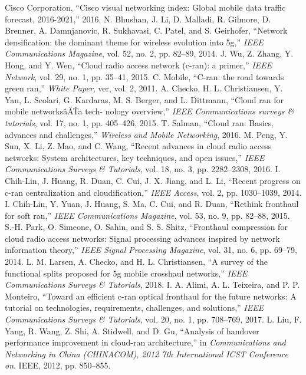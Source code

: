 \begin{multicols}{2}
\begin{thebibliography}{99}
 Cisco Corporation, “Cisco visual networking index: Global mobile data traffic forecast, 2016-2021,” 2016.
 N. Bhushan, J. Li, D. Malladi, R. Gilmore, D. Brenner, A. Damnjanovic, R. Sukhavasi, C. Patel, and S. Geirhofer, “Network densification: the dominant theme for wireless evolution into 5g,” \textit{IEEE Communications Magazine}, vol. 52, no. 2, pp. 82–89, 2014.
 J. Wu, Z. Zhang, Y. Hong, and Y. Wen, “Cloud radio access network (c-ran): a primer,” \textit{IEEE Network}, vol. 29, no. 1, pp. 35–41, 2015.
 C. Mobile, “C-ran: the road towards green ran,” \textit{White Paper}, ver, vol. 2, 2011.
 A. Checko, H. L. Christiansen, Y. Yan, L. Scolari, G. Kardaras, M. S. Berger, and L. Dittmann, “Cloud ran for mobile networksâĂŤa tech- nology overview,” \textit{IEEE Communications surveys \& tutorials}, vol. 17, no. 1, pp. 405–426, 2015.
 T. Salman, “Cloud ran: Basics, advances and challenges,” \textit{Wireless and Mobile Networking}, 2016.
 M. Peng, Y. Sun, X. Li, Z. Mao, and C. Wang, “Recent advances in cloud radio access networks: System architectures, key techniques, and open issues,” \textit{IEEE Communications Surveys \& Tutorials}, vol. 18, no. 3, pp. 2282–2308, 2016.
 I. Chih-Lin, J. Huang, R. Duan, C. Cui, J. X. Jiang, and L. Li, “Recent progress on c-ran centralization and cloudification,” \textit{IEEE Access}, vol. 2, pp. 1030–1039, 2014.
 I. Chih-Lin, Y. Yuan, J. Huang, S. Ma, C. Cui, and R. Duan, “Rethink fronthaul for soft ran,” \textit{IEEE Communications Magazine}, vol. 53, no. 9, pp. 82–88, 2015.
 S.-H. Park, O. Simeone, O. Sahin, and S. S. Shitz, “Fronthaul compression for cloud radio access networks: Signal processing advances inspired by network information theory,” \textit{IEEE Signal Processing Magazine}, vol. 31, no. 6, pp. 69–79, 2014.
 L. M. Larsen, A. Checko, and H. L. Christiansen, “A survey of the functional splits proposed for 5g mobile crosshaul networks,” \textit{IEEE Communications Surveys \& Tutorials}, 2018.
 I. A. Alimi, A. L. Teixeira, and P. P. Monteiro, “Toward an efficient c-ran optical fronthaul for the future networks: A tutorial on technologies, requirements, challenges, and solutions,” \textit{IEEE Communications Surveys \& Tutorials}, vol. 20, no. 1, pp. 708–769, 2017.
 L. Liu, F. Yang, R. Wang, Z. Shi, A. Stidwell, and D. Gu, “Analysis of handover performance improvement in cloud-ran architecture,” in \textit{Communications and Networking in China (CHINACOM), 2012 7th International ICST Conference on}. IEEE, 2012, pp. 850–855.

\end{thebibliography}
\end{multicols}
